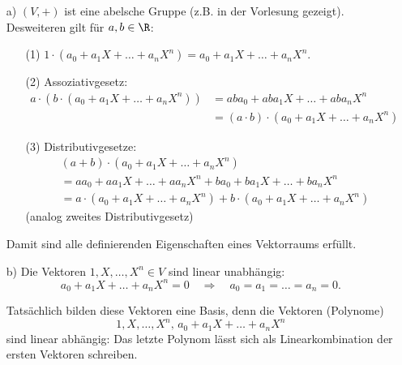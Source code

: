 \begin{itemize}
	\item[a)]
		$(V,+)$ ist eine abelsche Gruppe (z.B. in der Vorlesung gezeigt).\\

		Desweiteren gilt f\"ur $a,b \in \R$:
		\begin{itemize}
			\item[(1)] $1\cdot (a_0 + a_1X+\ldots + a_nX^n) = a_0 + a_1X+\ldots + a_nX^n$.
			\item[(2)] Assoziativgesetz:
				\begin{align*}
					a\cdot(b\cdot (a_0 + a_1X+\ldots + a_nX^n) ) 
						&= aba_0 + aba_1X+\ldots + aba_nX^n 		\\
						&= (a\cdot b)\cdot (a_0 + a_1X+\ldots + a_nX^n) 
				\end{align*}
			\item[(3)] Distributivgesetze:
				\begin{align*}
						&(a+b)\cdot (a_0 + a_1X+\ldots + a_nX^n)  								\\		
						&= aa_0 + aa_1X+\ldots + aa_nX^n + ba_0 + ba_1X+\ldots + ba_nX^n 			\\
						&= a\cdot(a_0 + a_1X+\ldots + a_nX^n) +  b\cdot(a_0 + a_1X+\ldots + a_nX^n) 
				\end{align*}	
				(analog zweites Distributivgesetz)
		\end{itemize}
		Damit sind alle definierenden Eigenschaften eines Vektorraums erf\"ullt.
	\item[b)]
		Die Vektoren $1, X, \ldots, X^n \in V$ sind linear unabh\"angig:
		$$
			a_0 + a_1X+\ldots + a_nX^n = 0 
			\quad
			\Rightarrow
			\quad
			a_0=a_1=\ldots=a_n=0.
		$$
		
		Tats\"achlich bilden diese Vektoren eine Basis, denn die Vektoren (Polynome)
		$$
			1,X, \ldots, X^n,\, a_0 + a_1X + \ldots + a_nX^n
		$$
		sind linear abh\"angig: Das letzte Polynom l\"asst sich als Linearkombination der ersten Vektoren schreiben.\\
		
\end{itemize}


